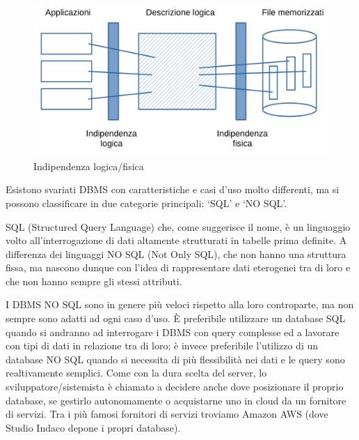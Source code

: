 \documentclass[12pt,a4paper]{article}
\begin{document}
\begin{figure}[H]
    \centering
    \includegraphics[width=.9\linewidth]{indipendenza_logica_fisica.png}
    \caption{Indipendenza logica/fisica}
\end{figure}

Esistono svariati DBMS con caratteristiche e casi d’uso molto differenti, ma si possono classificare in due categorie principali: ‘SQL’ e ‘NO SQL’.

SQL (Structured Query Language) che, come suggerisce il nome, è un linguaggio volto all’interrogazione di dati altamente strutturati in tabelle prima definite.
A differenza dei linguaggi NO SQL (Not Only SQL), che non hanno una struttura fissa, ma nascono dunque con l’idea di rappresentare dati eterogenei tra di loro e che non hanno sempre gli stessi attributi.

I DBMS NO SQL sono in genere più veloci rispetto alla loro controparte, ma non sempre sono adatti ad ogni caso d’uso. È preferibile utilizzare un database SQL quando si andranno ad interrogare i DBMS con query complesse ed a lavorare con tipi di dati in relazione tra di loro; è invece preferibile l’utilizzo di un database NO SQL quando si necessita di più flessibilità nei dati e le query sono realtivamente semplici.
Come con la dura scelta del server, lo sviluppatore/sistemista è chiamato a decidere anche dove posizionare il proprio database, se gestirlo autonomamente o acquistarne uno in cloud da un fornitore di servizi. Tra i più famosi fornitori di servizi troviamo Amazon AWS (dove Studio Indaco depone i propri database).
\end{document}
